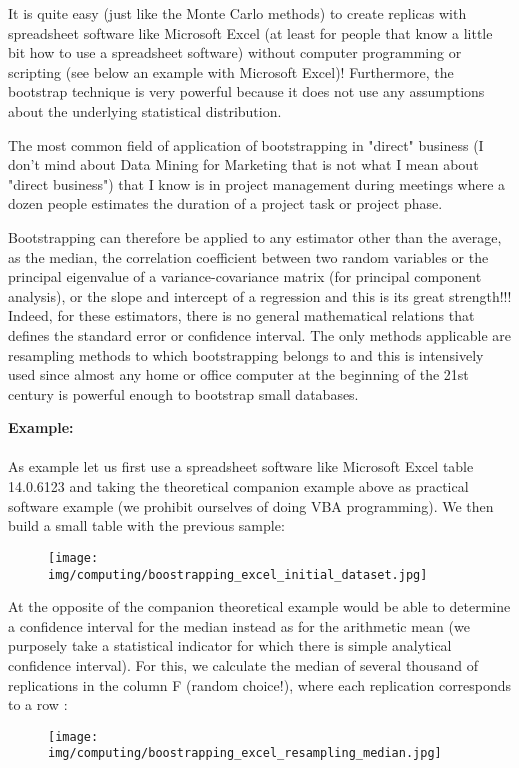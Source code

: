 	It is quite easy (just like the Monte Carlo methods) to create replicas with spreadsheet software like Microsoft Excel (at least for people that know a little bit how to use a spreadsheet software) without computer programming or scripting (see below an example with Microsoft Excel)! Furthermore, the bootstrap technique is very powerful because it does not use any assumptions about the underlying statistical distribution. 

	The most common field of application of bootstrapping in "direct" business (I don't mind about Data Mining for Marketing that is not what I mean about "direct business") that I know is in project management during meetings where a dozen people estimates the duration of a project task or project phase.
	
	Bootstrapping can therefore be applied to any estimator other than the average, as the median, the correlation coefficient between two random variables or the principal eigenvalue of a variance-covariance matrix (for principal component analysis), or the slope and intercept of a regression and this is its great strength!!! Indeed, for these estimators, there is no general mathematical relations that defines the standard error or confidence interval. The only methods applicable are resampling methods to which bootstrapping belongs to and this is intensively used since almost any home or office computer at the beginning of the 21st century is powerful enough to bootstrap small databases.
	\begin{tcolorbox}[colframe=black,colback=white,sharp corners]
	\textbf{{\Large {}}Example:}\\\\
	As example let us first use a spreadsheet software like Microsoft Excel table 14.0.6123 and taking the theoretical companion example above as practical software example (we prohibit ourselves of doing VBA programming). We then build a small table with the previous sample:
	\begin{figure}[H]
		\centering
		\texttt{[image: img/computing/boostrapping\_excel\_initial\_dataset.jpg]}
	\end{figure}
	At the opposite of the companion theoretical example  would be able to determine a confidence interval for the median instead as for the arithmetic mean (we purposely take a statistical indicator for which there is simple analytical confidence interval). For this, we calculate the median of several thousand of replications in the column F (random choice!), where each replication corresponds to a row :
	\begin{figure}[H]
		\centering
		\texttt{[image: img/computing/boostrapping\_excel\_resampling\_median.jpg]}
	\end{figure}
	\end{tcolorbox}
	
